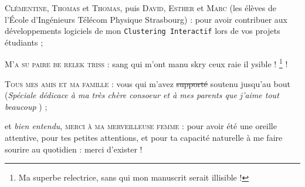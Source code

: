\begin{ThesisAcknowledgments}
\begin{todolist}
		\item[\itemok] \textsc{Clémentine}, \textsc{Thomas} et \textsc{Thomas}, puis \textsc{David}, \textsc{Esther} et \textsc{Marc} (les élèves de l'École d'Ingénieurs Télécom Physique Strasbourg) : pour avoir contribuer aux développements logiciels de mon \texttt{Clustering Interactif} lors de vos projets étudiants ;
		\item[\itemok] \textsc{M'a su paire be relek triss} : sang qui m'ont manu skry ceux raie il ysible ! \footnote{
			Ma superbe relectrice, sans qui mon manuscrit serait illisible !
		} !
		\item[\itemok] \textsc{Tous mes amis et ma famille} : vous qui m'avez \st{supporté} soutenu jusqu'au bout (\textit{Spéciale dédicace à ma très chère consoeur et à mes parents que j'aime tout beaucoup \faGrinWink}) ;
		\item[\itemok] et \textit{bien entendu}, \textsc{merci à ma merveilleuse femme} : pour avoir été une oreille attentive, pour tes petites attentions, et pour ta capacité naturelle à me faire sourire au quotidien : merci d'exister ! \textcolor{colorDarkPastelRed}{\faHeart}
	\end{todolist}

\end{ThesisAcknowledgments}
